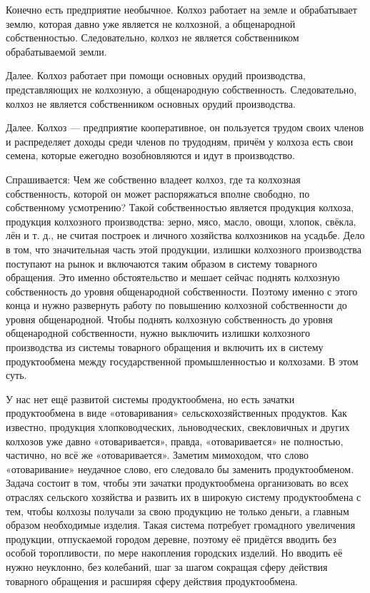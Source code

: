 \documentclass[12pt, a4paper, openany]{book}
\begin{document}
Конечно есть предприятие необычное. Колхоз работает на земле и обрабатывает землю, которая давно уже является не колхозной, а общенародной собственностью. Следовательно, колхоз не является собственником обрабатываемой земли.

Далее. Колхоз работает при помощи основных орудий производства, представляющих не колхозную, а общенародную собственность. Следовательно, колхоз не является собственником основных орудий производства.

Далее. Колхоз — предприятие кооперативное, он пользуется трудом своих членов и распределяет доходы среди членов по трудодням, причём у колхоза есть свои семена, которые ежегодно возобновляются и идут в производство.

Спрашивается: Чем же собственно владеет колхоз, где та колхозная собственность, которой он может распоряжаться вполне свободно, по собственному усмотрению? Такой собственностью является продукция колхоза, продукция колхозного производства: зерно, мясо, масло, овощи, хлопок, свёкла, лён и т. д., не считая построек и личного хозяйства колхозников на усадьбе. Дело в том, что значительная часть этой продукции, излишки колхозного производства поступают на рынок и включаются таким образом в систему товарного обращения. Это именно обстоятельство и мешает сейчас поднять колхозную собственность до уровня общенародной собственности. Поэтому именно с этого конца и нужно развернуть работу по повышению колхозной собственности до уровня общенародной. Чтобы поднять колхозную собственность до уровня общенародной собственности, нужно выключить излишки колхозного производства из системы товарного обращения и включить их в систему продуктообмена между государственной промышленностью и колхозами. В этом суть.

У нас нет ещё развитой системы продуктообмена, но есть зачатки продуктообмена в виде «отоваривания» сельскохозяйственных продуктов. Как известно, продукция хлопководческих, льноводческих, свекловичных и других колхозов уже давно «отоваривается», правда, «отоваривается» не полностью, частично, но всё же «отоваривается». Заметим мимоходом, что слово «отоваривание» неудачное слово, его следовало бы заменить продуктообменом. Задача состоит в том, чтобы эти зачатки продуктообмена организовать во всех отраслях сельского хозяйства и развить их в широкую систему продуктообмена с тем, чтобы колхозы получали за свою продукцию не только деньги, а главным образом необходимые изделия. Такая система потребует громадного увеличения продукции, отпускаемой городом деревне, поэтому её придётся вводить без особой торопливости, по мере накопления городских изделий. Но вводить её нужно неуклонно, без колебаний, шаг за шагом сокращая сферу действия товарного обращения и расширяя сферу действия продуктообмена.
\end{document}
